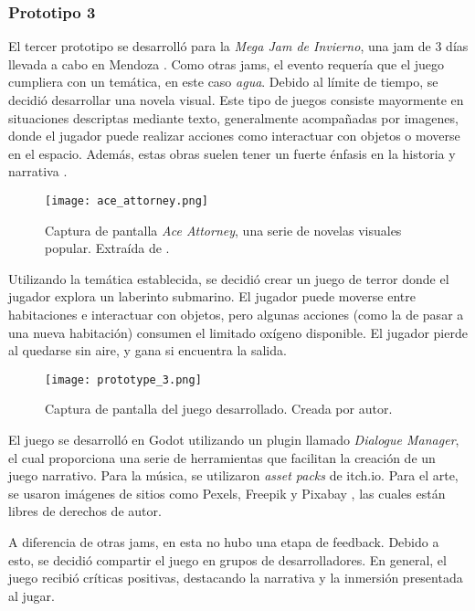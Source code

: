 \subsubsection{Prototipo 3}
El tercer prototipo se desarrolló para la \textit{Mega Jam de Invierno}, una jam de 3 días llevada a cabo en Mendoza \cite{MEGAJAMInvierno}. Como otras jams, el evento requería que el juego cumpliera con un temática, en este caso \textit{agua}.
Debido al límite de tiempo, se decidió desarrollar una novela visual. Este tipo de juegos consiste mayormente en situaciones descriptas mediante texto, generalmente acompañadas por imagenes, donde el jugador puede realizar acciones como interactuar con objetos o moverse en el espacio. Además, estas obras suelen tener un fuerte énfasis en la historia y narrativa \cite{VisualNovel2025}.
%
\begin{figure}[H]
  \centering
  \texttt{[image: ace\_attorney.png]}
  \caption{Captura de pantalla \textit{Ace Attorney}, una serie de novelas visuales popular. Extraída de \cite{FilePhoenixWright2020}.}
  \label{fig:x ejemplo novela visual} 
\end{figure}
%
\par Utilizando la temática establecida, se decidió crear un juego de terror donde el jugador explora un laberinto submarino. El jugador puede moverse entre habitaciones e interactuar con objetos, pero algunas acciones (como la de pasar a una nueva habitación) consumen el limitado oxígeno disponible. El jugador pierde al quedarse sin aire, y gana si encuentra la salida.
%
\begin{figure}[H]
  \centering
  \texttt{[image: prototype\_3.png]}
  \caption{Captura de pantalla del juego desarrollado. Creada por autor.}
  \label{fig:x prototypo 3 captura} 
\end{figure}
%
\par El juego se desarrolló en Godot utilizando un plugin llamado \textit{Dialogue Manager}, el cual proporciona una serie de herramientas que facilitan la creación de un juego narrativo. Para la música, se utilizaron \textit{asset packs} de itch.io. Para el arte, se usaron imágenes de sitios como Pexels, Freepik y Pixabay \cite{57MillionStunning,FreepikAllinOneAI,FotosStockGratis}, las cuales están libres de derechos de autor.
\bigbreak
\par A diferencia de otras jams, en esta no hubo una etapa de feedback. Debido a esto, se decidió compartir el juego en grupos de desarrolladores. En general, el juego recibió críticas positivas, destacando la narrativa y la inmersión presentada al jugar.